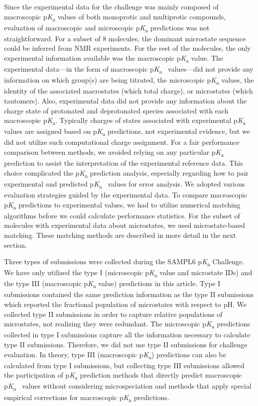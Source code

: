\documentclass[9pt,lineno,final]{elife}
\newcommand{\pKa}{p\textit{K}\textsubscript{a}}
\begin{document}
Since the experimental data for the challenge was mainly composed of macroscopic \pKa{} values of both monoprotic and multiprotic compounds, evaluation of macroscopic and microscopic \pKa{} predictions was not straightforward. 
For a subset of 8 molecules, the dominant microstate sequence could be inferred from NMR experiments. 
For the rest of the molecules, the only experimental information available was the macroscopic \pKa{} value.
The experimental data---in the form of macroscopic \pKa{}~ values---did not provide any information on which group(s) are being titrated, the microscopic \pKa{} values, the identity of the associated macrostates (which total charge), or microstates (which tautomers). 
Also, experimental data did not provide any information about the charge state of protonated and deprotonated species associated with each macroscopic \pKa{}. 
Typically charges of states associated with experimental \pKa{} values are assigned based on \pKa{} predictions, not experimental evidence, but we did not utilize such computational charge assignment.
For a fair performance comparison between methods, we avoided relying on any particular \pKa{} prediction to assist the interpretation of the experimental reference data.
This choice complicated the \pKa{} prediction analysis, especially regarding how to pair experimental and predicted \pKa{}~ values for error analysis.
We adopted various evaluation strategies guided by the experimental data. 
To compare macroscopic \pKa{} predictions to experimental values, we had to utilize numerical matching algorithms before we could calculate performance statistics. 
For the subset of molecules with experimental data about microstates, we used microstate-based matching. 
These matching methods are described in more detail in the next section.

Three types of submissions were collected during the SAMPL6 \pKa{} Challenge. 
We have only utilized the type I (microscopic \pKa{} value and microstate IDs) and the type III (macroscopic \pKa{} value) predictions in this article. 
Type I submissions contained the same prediction information as the type II submissions which reported the fractional population of microstates with respect to pH.
We collected type II submissions in order to capture relative populations of microstates, not realizing they were redundant.  
The microscopic \pKa{} predictions collected in type I submissions capture all the information necessary to calculate type II submissions. 
Therefore, we did not use type II submissions for challenge evaluation. 
In theory, type III (macroscopic \pKa{}) predictions can also be calculated from type I submissions, but collecting type III submissions allowed the participation of \pKa{} prediction methods that directly predict macroscopic \pKa{}~ values without considering microspeciation and methods that apply special empirical corrections for macroscopic \pKa{} predictions.
\end{document}
